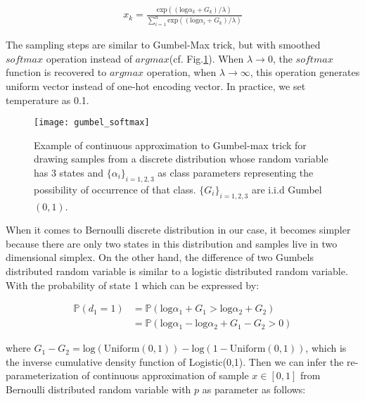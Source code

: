\begin{equation} \label{gumbel_softmax}
\begin{aligned}
x_{k} = \frac{\text{exp}((\text{log}\alpha_k + G_k)/\lambda)}{\sum_{i=1}^{n}\text{exp}((\text{log}\alpha_i + G_k)/\lambda)}
\end{aligned}
\end{equation}

The sampling steps are similar to Gumbel-Max trick, but with smoothed $softmax$ operation instead of $argmax$(cf. Fig.\ref{fig:gumbel_softmax}). When $\lambda \rightarrow 0$, the $softmax$ function is recovered to $argmax$ operation, when $\lambda \rightarrow \infty$, this operation generates uniform vector instead of one-hot encoding vector. In practice, we set temperature as 0.1.

\begin{figure}[h!]
	\begin{center}
		\texttt{[image: gumbel\_softmax]}
		\caption{Example of continuous approximation to Gumbel-max trick for drawing samples from a discrete distribution whose random variable has 3 states and $\{\alpha_{i}\}_{i=1,2,3}$ as class parameters representing the possibility of occurrence of that class. $\{G_{i}\}_{i=1,2,3}$ are i.i.d Gumbel$(0,1)$\cite{maddison2016concrete}.}		
		\label{fig:gumbel_softmax}
	\end{center}
\end{figure}

When it comes to Bernoulli discrete distribution in our case, it becomes simpler because there are only two states in this distribution and samples live in two dimensional simplex. On the other hand, the difference of two Gumbels distributed random variable is similar to a logistic distributed random variable.  With the probability of state 1 which can be expressed by:

\[
\begin{aligned}
\mathbb P(d_1 = 1) &= \mathbb P(\text{log} \alpha_1 + G_1 >\text{log} \alpha_2 + G_2)\\
&=\mathbb P(\text{log} \alpha_1 - \text{log} \alpha_2 + G_1 - G_2 > 0)
\end{aligned}
\] 

where $G_1 - G_2 = \text{log}(\text{Uniform}(0,1)) - \text{log}(1-\text{Uniform}(0,1))$, which is the inverse cumulative density function of Logistic(0,1).
Then we can infer the re-parameterization of continuous approximation of sample $x \in [0, 1]$ from Bernoulli distributed random variable with $p$ as parameter as follows:

